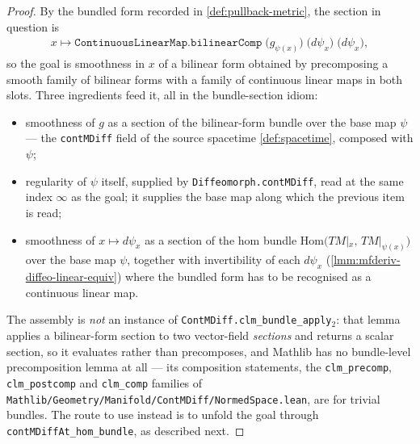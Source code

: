 \begin{proof}
    \leanok
    By the bundled form recorded in \ref{def:pullback-metric}, the section in question is
    \begin{align}
        x \longmapsto \mathtt{ContinuousLinearMap.bilinearComp}\;\big(g_{\psi(x)}\big)\;\big(d\psi_x\big)\;\big(d\psi_x\big),
    \end{align}
    so the goal is smoothness in $x$ of a bilinear form obtained by precomposing a smooth family of bilinear forms with a family of continuous linear maps in both slots. Three ingredients feed it, all in the bundle-section idiom:
    \begin{itemize}
        \item smoothness of $g$ as a section of the bilinear-form bundle over the base map $\psi$ --- the \texttt{contMDiff} field of the source spacetime \ref{def:spacetime}, composed with $\psi$;
        \item regularity of $\psi$ itself, supplied by \texttt{Diffeomorph.contMDiff}, read at the same index $\infty$ as the goal; it supplies the base map along which the previous item is read;
        \item smoothness of $x \mapsto d\psi_x$ as a section of the hom bundle $\mathrm{Hom}\big(TM|_x,\, TM|_{\psi(x)}\big)$ over the base map $\psi$, together with invertibility of each $d\psi_x$ (\ref{lmm:mfderiv-diffeo-linear-equiv}) where the bundled form has to be recognised as a continuous linear map.
    \end{itemize}
    The assembly is \emph{not} an instance of \texttt{ContMDiff.clm\_bundle\_apply\ensuremath{_2}}: that lemma applies a bilinear-form section to two vector-field \emph{sections} and returns a scalar section, so it evaluates rather than precomposes, and Mathlib has no bundle-level precomposition lemma at all --- its composition statements, the \texttt{clm\_precomp}, \texttt{clm\_postcomp} and \texttt{clm\_comp} families of \texttt{Mathlib/Geometry/Manifold/ContMDiff/NormedSpace.lean}, are for trivial bundles. The route to use instead is to unfold the goal through \texttt{contMDiffAt\_hom\_bundle}, as described next.


\end{proof}

